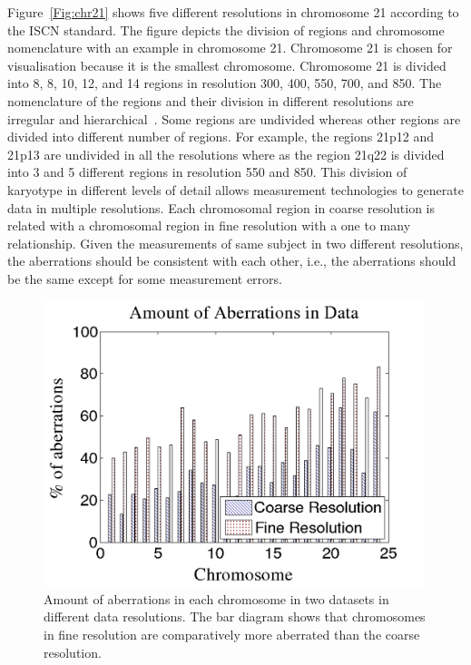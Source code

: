 Figure~\ref{Fig:chr21} shows five different resolutions in 
chromosome 21 according to the ISCN standard. The figure depicts 
the division of regions and chromosome nomenclature with 
an example in chromosome 21. Chromosome 21 is chosen 
for visualisation because it is the smallest chromosome. Chromosome 21 is
divided into 8, 8, 10, 12, and 14 regions in resolution
300, 400, 550, 700, and 850. The nomenclature of the regions 
and their division in different resolutions are irregular 
and hierarchical~\cite{shaffer05}. Some regions are  
undivided whereas other regions are divided into  
different number of regions. For example, the regions 21p12 and 
21p13 are undivided in all the resolutions where as the 
region 21q22 is  divided into 3 and 5 different regions 
in resolution  550 and 850. This division of karyotype
in different levels of detail allows 
measurement technologies to generate data in multiple
resolutions. Each chromosomal region in coarse 
resolution is related with a chromosomal region in
fine resolution with a one to many relationship. 
Given the measurements of same subject in two different
resolutions, the aberrations should be consistent with
each other, i.e., the aberrations should be the same except for some 
measurement errors.


\begin{figure}[h!]
\centering
\includegraphics[trim=5mm 2mm 18mm 2mm,width=0.99\textwidth]{figures/perabar}
\caption[Amount of Aberrations in Different Chromosomes]
{Amount of aberrations in each chromosome in two datasets in different data
resolutions. The bar diagram shows that chromosomes in fine resolution 
are comparatively more aberrated than the coarse resolution.} 
\label{Fig:perabar}
\end{figure}



